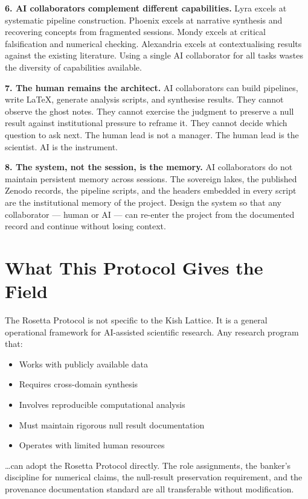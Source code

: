 \documentclass[11pt, letterpaper, openany]{book}
\begin{document}
\textbf{6. AI collaborators complement different capabilities.} Lyra excels at
systematic pipeline construction. Phoenix excels at narrative synthesis and recovering
concepts from fragmented sessions. Mondy excels at critical falsification and numerical
checking. Alexandria excels at contextualising results against the existing literature.
Using a single AI collaborator for all tasks wastes the diversity of capabilities
available.

\textbf{7. The human remains the architect.} AI collaborators can build pipelines,
write LaTeX, generate analysis scripts, and synthesise results. They cannot observe
the ghost notes. They cannot exercise the judgment to preserve a null result against
institutional pressure to reframe it. They cannot decide which question to ask next.
The human lead is not a manager. The human lead is the scientist. AI is the instrument.

\textbf{8. The system, not the session, is the memory.} AI collaborators do not
maintain persistent memory across sessions. The sovereign lakes, the published Zenodo
records, the pipeline scripts, and the headers embedded in every script are the
institutional memory of the project. Design the system so that any collaborator ---
human or AI --- can re-enter the project from the documented record and continue
without losing context.

\section*{What This Protocol Gives the Field}

The Rosetta Protocol is not specific to the Kish Lattice. It is a general operational
framework for AI-assisted scientific research. Any research program that:

\begin{itemize}
\item Works with publicly available data
\item Requires cross-domain synthesis
\item Involves reproducible computational analysis
\item Must maintain rigorous null result documentation
\item Operates with limited human resources
\end{itemize}

\ldots can adopt the Rosetta Protocol directly. The role assignments, the banker's
discipline for numerical claims, the null-result preservation requirement, and the
provenance documentation standard are all transferable without modification.
\end{document}
